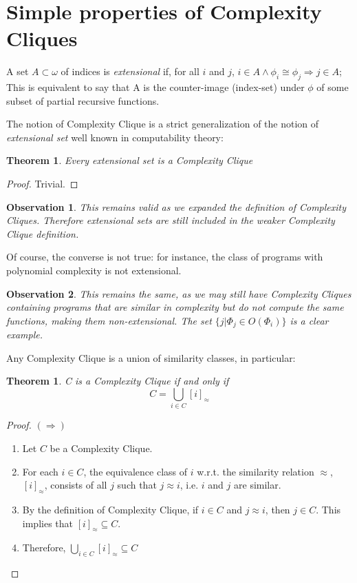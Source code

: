 \documentclass[10pt, a4paper, oneside, titlepage, draft]{article}
\newtheorem{observation}{Observation}[shrd]
\newtheorem{theorem}[shrd]{Theorem}
\begin{document}
\section{Simple properties of Complexity Cliques}
A set $A \subset \omega$ of indices is \emph{extensional} if, for all $i$ and $j$, $i \in A \wedge \phi_i \cong \phi_j \Rightarrow j \in A$; This is equivalent to say that A is the counter-image (index-set) under $\phi$ of some subset of partial recursive functions.

The notion of Complexity Clique is a strict generalization of the notion of \emph{extensional set} well known in computability theory:

\begin{theorem}
    Every extensional set is a Complexity Clique
\end{theorem}

\begin{proof}
    Trivial.
\end{proof}

\begin{observation}
    This remains valid as we expanded the definition of Complexity Cliques. Therefore extensional sets are still included in the weaker Complexity Clique definition.
\end{observation}

Of course, the converse is not true: for instance, the class of programs with polynomial complexity is not extensional.

\begin{observation}
    This remains the same, as we may still have Complexity Cliques containing programs that are similar in complexity but do not compute the same functions, making them non-extensional. The set $\{j|\Phi_j \in O(\Phi_i)\}$ is a clear example.
\end{observation}

Any Complexity Clique is a union of similarity classes, in particular:

\begin{theorem}
    C is a Complexity Clique if and only if
    \begin{equation*}
        C = \bigcup_{i \in C} [i]_{\approx}
    \end{equation*}
\end{theorem}

\begin{proof}   $(\Rightarrow)$
    \begin{enumerate}
        \item Let $C$ be a Complexity Clique.
        \item For each $i \in C$, the equivalence class of $i$ w.r.t. the similarity relation $\approx$, $[i]_{\approx}$, consists of all $j$ such that $j \approx i$, i.e. $i$ and $j$ are similar.
        \item By the definition of Complexity Clique, if $i\in C$ and $j \approx i$, then $j \in C$. This implies that $[i]_{\approx} \subseteq C$.
        \item Therefore, $\bigcup_{i\in C}[i]_{\approx} \subseteq C$
    \end{enumerate}
\end{proof}
\end{document}
